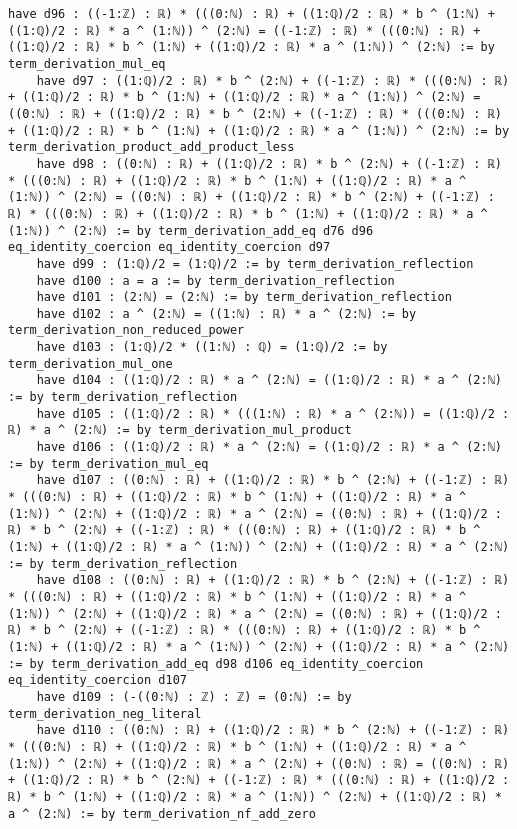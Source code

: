 \documentclass{article}
\begin{document}
\begin{tcolorbox}[colback=white!10, width=\linewidth]
\begin{lstlisting}[language=Lean4]
    have d96 : ((-1:ℤ) : ℝ) * (((0:ℕ) : ℝ) + ((1:ℚ)/2 : ℝ) * b ^ (1:ℕ) + ((1:ℚ)/2 : ℝ) * a ^ (1:ℕ)) ^ (2:ℕ) = ((-1:ℤ) : ℝ) * (((0:ℕ) : ℝ) + ((1:ℚ)/2 : ℝ) * b ^ (1:ℕ) + ((1:ℚ)/2 : ℝ) * a ^ (1:ℕ)) ^ (2:ℕ) := by term_derivation_mul_eq
    have d97 : ((1:ℚ)/2 : ℝ) * b ^ (2:ℕ) + ((-1:ℤ) : ℝ) * (((0:ℕ) : ℝ) + ((1:ℚ)/2 : ℝ) * b ^ (1:ℕ) + ((1:ℚ)/2 : ℝ) * a ^ (1:ℕ)) ^ (2:ℕ) = ((0:ℕ) : ℝ) + ((1:ℚ)/2 : ℝ) * b ^ (2:ℕ) + ((-1:ℤ) : ℝ) * (((0:ℕ) : ℝ) + ((1:ℚ)/2 : ℝ) * b ^ (1:ℕ) + ((1:ℚ)/2 : ℝ) * a ^ (1:ℕ)) ^ (2:ℕ) := by term_derivation_product_add_product_less
    have d98 : ((0:ℕ) : ℝ) + ((1:ℚ)/2 : ℝ) * b ^ (2:ℕ) + ((-1:ℤ) : ℝ) * (((0:ℕ) : ℝ) + ((1:ℚ)/2 : ℝ) * b ^ (1:ℕ) + ((1:ℚ)/2 : ℝ) * a ^ (1:ℕ)) ^ (2:ℕ) = ((0:ℕ) : ℝ) + ((1:ℚ)/2 : ℝ) * b ^ (2:ℕ) + ((-1:ℤ) : ℝ) * (((0:ℕ) : ℝ) + ((1:ℚ)/2 : ℝ) * b ^ (1:ℕ) + ((1:ℚ)/2 : ℝ) * a ^ (1:ℕ)) ^ (2:ℕ) := by term_derivation_add_eq d76 d96 eq_identity_coercion eq_identity_coercion d97
    have d99 : (1:ℚ)/2 = (1:ℚ)/2 := by term_derivation_reflection
    have d100 : a = a := by term_derivation_reflection
    have d101 : (2:ℕ) = (2:ℕ) := by term_derivation_reflection
    have d102 : a ^ (2:ℕ) = ((1:ℕ) : ℝ) * a ^ (2:ℕ) := by term_derivation_non_reduced_power
    have d103 : (1:ℚ)/2 * ((1:ℕ) : ℚ) = (1:ℚ)/2 := by term_derivation_mul_one
    have d104 : ((1:ℚ)/2 : ℝ) * a ^ (2:ℕ) = ((1:ℚ)/2 : ℝ) * a ^ (2:ℕ) := by term_derivation_reflection
    have d105 : ((1:ℚ)/2 : ℝ) * (((1:ℕ) : ℝ) * a ^ (2:ℕ)) = ((1:ℚ)/2 : ℝ) * a ^ (2:ℕ) := by term_derivation_mul_product
    have d106 : ((1:ℚ)/2 : ℝ) * a ^ (2:ℕ) = ((1:ℚ)/2 : ℝ) * a ^ (2:ℕ) := by term_derivation_mul_eq
    have d107 : ((0:ℕ) : ℝ) + ((1:ℚ)/2 : ℝ) * b ^ (2:ℕ) + ((-1:ℤ) : ℝ) * (((0:ℕ) : ℝ) + ((1:ℚ)/2 : ℝ) * b ^ (1:ℕ) + ((1:ℚ)/2 : ℝ) * a ^ (1:ℕ)) ^ (2:ℕ) + ((1:ℚ)/2 : ℝ) * a ^ (2:ℕ) = ((0:ℕ) : ℝ) + ((1:ℚ)/2 : ℝ) * b ^ (2:ℕ) + ((-1:ℤ) : ℝ) * (((0:ℕ) : ℝ) + ((1:ℚ)/2 : ℝ) * b ^ (1:ℕ) + ((1:ℚ)/2 : ℝ) * a ^ (1:ℕ)) ^ (2:ℕ) + ((1:ℚ)/2 : ℝ) * a ^ (2:ℕ) := by term_derivation_reflection
    have d108 : ((0:ℕ) : ℝ) + ((1:ℚ)/2 : ℝ) * b ^ (2:ℕ) + ((-1:ℤ) : ℝ) * (((0:ℕ) : ℝ) + ((1:ℚ)/2 : ℝ) * b ^ (1:ℕ) + ((1:ℚ)/2 : ℝ) * a ^ (1:ℕ)) ^ (2:ℕ) + ((1:ℚ)/2 : ℝ) * a ^ (2:ℕ) = ((0:ℕ) : ℝ) + ((1:ℚ)/2 : ℝ) * b ^ (2:ℕ) + ((-1:ℤ) : ℝ) * (((0:ℕ) : ℝ) + ((1:ℚ)/2 : ℝ) * b ^ (1:ℕ) + ((1:ℚ)/2 : ℝ) * a ^ (1:ℕ)) ^ (2:ℕ) + ((1:ℚ)/2 : ℝ) * a ^ (2:ℕ) := by term_derivation_add_eq d98 d106 eq_identity_coercion eq_identity_coercion d107
    have d109 : (-((0:ℕ) : ℤ) : ℤ) = (0:ℕ) := by term_derivation_neg_literal
    have d110 : ((0:ℕ) : ℝ) + ((1:ℚ)/2 : ℝ) * b ^ (2:ℕ) + ((-1:ℤ) : ℝ) * (((0:ℕ) : ℝ) + ((1:ℚ)/2 : ℝ) * b ^ (1:ℕ) + ((1:ℚ)/2 : ℝ) * a ^ (1:ℕ)) ^ (2:ℕ) + ((1:ℚ)/2 : ℝ) * a ^ (2:ℕ) + ((0:ℕ) : ℝ) = ((0:ℕ) : ℝ) + ((1:ℚ)/2 : ℝ) * b ^ (2:ℕ) + ((-1:ℤ) : ℝ) * (((0:ℕ) : ℝ) + ((1:ℚ)/2 : ℝ) * b ^ (1:ℕ) + ((1:ℚ)/2 : ℝ) * a ^ (1:ℕ)) ^ (2:ℕ) + ((1:ℚ)/2 : ℝ) * a ^ (2:ℕ) := by term_derivation_nf_add_zero

\end{lstlisting}
\end{tcolorbox}
\end{document}
